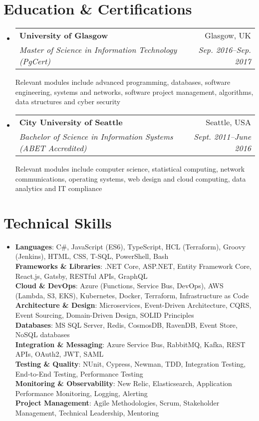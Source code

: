 \documentclass[letterpaper,11pt]{article}
\makeatletter
\newcommand{\resumeItem}[1]{
  \item\small{
    {#1 \vspace{-1pt}}
  }
}
\newcommand{\resumeSubheading}[4]{
  \item
    \begin{tabular*}{0.97\textwidth}[t]{l@{\extracolsep{\fill}}r}
      \textbf{#1} & #2 \\
      \textit{\small#3} & \textit{\small #4} \\
    \end{tabular*}\vspace{1mm}
}
\newcommand{\resumeSubHeadingListStart}{\begin{itemize}[leftmargin=0.15in, label={}]}
\newcommand{\resumeSubHeadingListEnd}{\end{itemize}}
\makeatother
\begin{document}
\section{Education \& Certifications}
  \resumeSubHeadingListStart
    \resumeSubheading
      {University of Glasgow}{Glasgow, UK}
      {Master of Science in Information Technology (PgCert)}{Sep. 2016--Sep. 2017}
      \small{Relevant modules include advanced programming, databases, software engineering, systems and networks, software project management, algorithms, data structures and cyber security}
    \resumeSubheading
      {City University of Seattle}{Seattle, USA}
      {Bachelor of Science in Information Systems (ABET Accredited)}{Sept. 2011--June 2016}
      \small{Relevant modules include computer science, statistical computing, network communications, operating systems, web design and cloud computing, data analytics and IT compliance}
  \resumeSubHeadingListEnd

\section{Technical Skills}
  \resumeSubHeadingListStart
    \resumeItem{
      \textbf{Languages}{: C\#, JavaScript (ES6), TypeScript, HCL (Terraform), Groovy (Jenkins), HTML, CSS, T-SQL, PowerShell, Bash} \\[1mm]
      \textbf{Frameworks \& Libraries}{: .NET Core, ASP.NET, Entity Framework Core, React.js, Gatsby, RESTful APIs, GraphQL} \\[1mm]
      \textbf{Cloud \& DevOps}{: Azure (Functions, Service Bus, DevOps), AWS (Lambda, S3, EKS), Kubernetes, Docker, Terraform, Infrastructure as Code} \\[1mm]
      \textbf{Architecture \& Design}{: Microservices, Event-Driven Architecture, CQRS, Event Sourcing, Domain-Driven Design, SOLID Principles} \\[1mm]
      \textbf{Databases}{: MS SQL Server, Redis, CosmosDB, RavenDB, Event Store, NoSQL databases} \\[1mm]
      \textbf{Integration \& Messaging}{: Azure Service Bus, RabbitMQ, Kafka, REST APIs, OAuth2, JWT, SAML} \\[1mm]
      \textbf{Testing \& Quality}{: NUnit, Cypress, Newman, TDD, Integration Testing, End-to-End Testing, Performance Testing} \\[1mm]
      \textbf{Monitoring \& Observability}{: New Relic, Elasticsearch, Application Performance Monitoring, Logging, Alerting} \\[1mm]
      \textbf{Project Management}{: Agile Methodologies, Scrum, Stakeholder Management, Technical Leadership, Mentoring}\\[1mm]
    }
  \resumeSubHeadingListEnd

\end{document}
